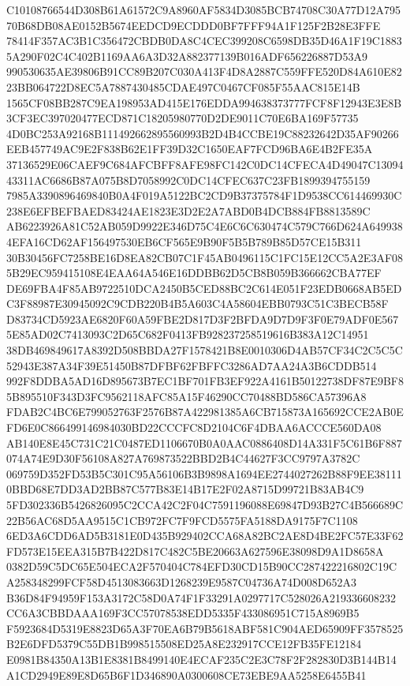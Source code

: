 \documentclass[UTF8,fontset=fandol,zihao=-4,a4paper]{ctexart}
\begin{document}
{{C10108766544D308B61A61572C9A8960AF5834D3085BCB74708C30A77D12A79570B68DB08AE0152B5674EEDCD9ECDDD0BF7FFF94A1F125F2B28E3FFE
78414F357AC3B1C356472CBDB0DA8C4CEC399208C6598DB35D46A1F19C18835A290F02C4C402B1169AA6A3D32A882377139B016ADF656226887D53A9
990530635AE39806B91CC89B207C030A413F4D8A2887C559FFE520D84A610E8223BB064722D8EC5A7887430485CDAE497C0467CF085F55AAC815E14B
1565CF08BB287C9EA198953AD415E176EDDA994638373777FCF8F12943E3E8B3CF3EC397020477ECD871C18205980770D2DE9011C70E6BA169F57735
4D0BC253A92168B111492662895560993B2D4B4CCBE19C88232642D35AF90266EEB457749AC9E2F838B62E1FF39D32C1650EAF7FCD96BA6E4B2FE35A
37136529E06CAEF9C684AFCBFF8AFE98FC142C0DC14CFECA4D49047C1309443311AC6686B87A075B8D7058992C0DC14CFEC637C23FB1899394755159
7985A3390896469840B0A4F019A5122BC2CD9B37375784F1D9538CC614469930C238E6EFBEFBAED83424AE1823E3D2E2A7ABD0B4DCB884FB8813589C
AB6223926A81C52AB059D9922E346D75C4E6C6C630474C579C766D624A6499384EFA16CD62AF156497530EB6CF565E9B90F5B5B789B85D57CE15B311
30B30456FC7258BE16D8EA82CB07C1F45AB0496115C1FC15E12CC5A2E3AF085B29EC959415108E4EAA64A546E16DDBB62D5CB8B059B366662CBA77EF
DE69FBA4F85AB9722510DCA2450B5CED88BC2C614E051F23EDB0668AB5EDC3F88987E30945092C9CDB220B4B5A603C4A58604EBB0793C51C3BECB58F
D83734CD5923AE6820F60A59FBE2D817D3F2BFDA9D7D9F3F0E79ADF0E5675E85AD02C7413093C2D65C682F0413FB928237258519616B383A12C14951
38DB469849617A8392D508BBDA27F1578421B8E0010306D4AB57CF34C2C5C5C52943E387A34F39E51450B87DFBF62FBFFC3286AD7AA24A3B6CDDB514
992F8DDBA5AD16D895673B7EC1BF701FB3EF922A4161B50122738DF87E9BF85B895510F343D3FC9562118AFC85A15F46290CC70488BD586CA57396A8
FDAB2C4BC6E799052763F2576B87A422981385A6CB715873A165692CCE2AB0EFD6E0C866499146984030BD22CCCFC8D2104C6F4DBAA6ACCCE560DA08
AB140E8E45C731C21C0487ED1106670B0A0AAC0886408D14A331F5C61B6F887074A74E9D30F56108A827A769873522BBD2B4C44627F3CC9797A3782C
069759D352FD53B5C301C95A56106B3B9898A1694EE2744027262B88F9EE381110BBD68E7DD3AD2BB87C577B83E14B17E2F02A8715D99721B83AB4C9
5FD302336B5426826095C2CCA42C2F04C7591196088E69847D93B27C4B566689C22B56AC68D5AA9515C1CB972FC7F9FCD5575FA5188DA9175F7C1108
6ED3A6CDD6AD5B3181E0D435B929402CCA68A82BC2AE8D4BE2FC57E33F62FD573E15EEA315B7B422D817C482C5BE20663A627596E38098D9A1D8658A
0382D59C5DC65E504ECA2F570404C784EFD30CD15B90CC287422216802C19CA258348299FCF58D4513083663D1268239E9587C04736A74D008D652A3
B36D84F94959F153A3172C58D0A74F1F33291A0297717C528026A219336608232CC6A3CBBDAAA169F3CC57078538EDD5335F433086951C715A8969B5
F5923684D5319E8823D65A3F70EA6B79B5618ABF581C904AED65909FF3578525B2E6DFD5379C55DB1B998515508ED25A8E232917CCE12FB35FE12184
E0981B84350A13B1E8381B8499140E4ECAF235C2E3C78F2F282830D3B144B14A1CD2949E89E8D65B6F1D346890A0300608CE73EBE9AA5258E6455B41
}}
\end{document}
